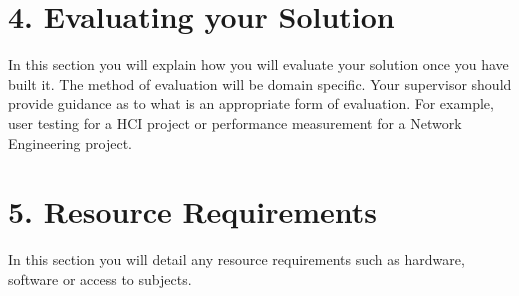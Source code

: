 \documentclass[11pt, a4paper, twoside, openright]{report}
\begin{document}
\section*{4. Evaluating your Solution}


In this section you will explain how you will evaluate your solution
once you have built it. The method of evaluation will be domain
specific. Your supervisor should provide guidance as to what is an
appropriate form of evaluation. For example, user testing for a HCI
project or performance measurement for a Network Engineering project.

\section*{5. Resource Requirements}


In this section you will detail any resource requirements such as
hardware, software or access to subjects.

\backmatter

%


\end{document}
